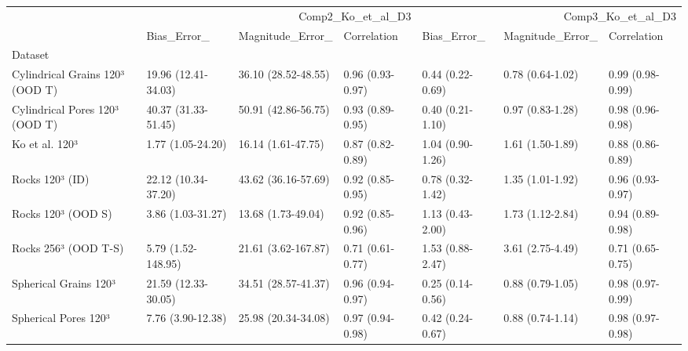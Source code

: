 \begin{tabular}{lllllll}
\toprule
 & \multicolumn{3}{r}{Comp2_Ko_et_al_D3} & \multicolumn{3}{r}{Comp3_Ko_et_al_D3} \\
 & Bias_Error_ & Magnitude_Error_ & Correlation & Bias_Error_ & Magnitude_Error_ & Correlation \\
Dataset &  &  &  &  &  &  \\
\midrule
Cylindrical Grains 120³ (OOD T) & 19.96 (12.41-34.03) & 36.10 (28.52-48.55) & 0.96 (0.93-0.97) & 0.44 (0.22-0.69) & 0.78 (0.64-1.02) & 0.99 (0.98-0.99) \\
Cylindrical Pores 120³ (OOD T) & 40.37 (31.33-51.45) & 50.91 (42.86-56.75) & 0.93 (0.89-0.95) & 0.40 (0.21-1.10) & 0.97 (0.83-1.28) & 0.98 (0.96-0.98) \\
Ko et al. 120³ & 1.77 (1.05-24.20) & 16.14 (1.61-47.75) & 0.87 (0.82-0.89) & 1.04 (0.90-1.26) & 1.61 (1.50-1.89) & 0.88 (0.86-0.89) \\
Rocks 120³ (ID) & 22.12 (10.34-37.20) & 43.62 (36.16-57.69) & 0.92 (0.85-0.95) & 0.78 (0.32-1.42) & 1.35 (1.01-1.92) & 0.96 (0.93-0.97) \\
Rocks 120³ (OOD S) & 3.86 (1.03-31.27) & 13.68 (1.73-49.04) & 0.92 (0.85-0.96) & 1.13 (0.43-2.00) & 1.73 (1.12-2.84) & 0.94 (0.89-0.98) \\
Rocks 256³ (OOD T-S) & 5.79 (1.52-148.95) & 21.61 (3.62-167.87) & 0.71 (0.61-0.77) & 1.53 (0.88-2.47) & 3.61 (2.75-4.49) & 0.71 (0.65-0.75) \\
Spherical Grains 120³ & 21.59 (12.33-30.05) & 34.51 (28.57-41.37) & 0.96 (0.94-0.97) & 0.25 (0.14-0.56) & 0.88 (0.79-1.05) & 0.98 (0.97-0.99) \\
Spherical Pores 120³ & 7.76 (3.90-12.38) & 25.98 (20.34-34.08) & 0.97 (0.94-0.98) & 0.42 (0.24-0.67) & 0.88 (0.74-1.14) & 0.98 (0.97-0.98) \\
\bottomrule
\end{tabular}
